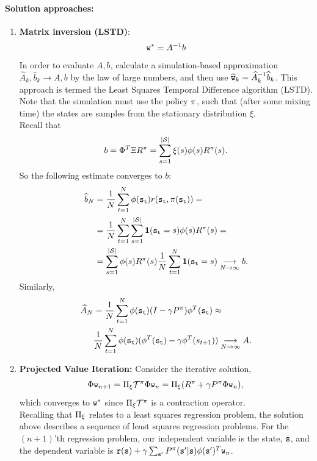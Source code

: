 \paragraph{Solution approaches:}
\begin{enumerate}
\item \textbf{Matrix inversion (LSTD)}: $${\tt w}^* = A^{-1}b$$
In order to evaluate $A,b$, calculate a simulation-based approximation $\widehat{A}_k,\hat{b}_k \rightarrow A,b$ by the law of large numbers, and then use $\widehat{{\tt w}}_k = \widehat{A}_k^{-1} \widehat{b}_k$. This approach is termed the Least Squares Temporal Difference algorithm (LSTD). Note that the simulation must use the policy $\pi$, such that (after some mixing time) the states are samples from the stationary distribution $\xi$.\\
Recall that
$$b = \Phi^T \Xi R^\pi = \sum_{s=1}^{|\mathcal{S}|} \xi(s)  {\phi}(s) R^\pi(s).$$
So the following estimate converges to $b$:
\begin{align*}
\widehat{b}_N &= \frac{1}{N} \sum_{t=1}^N  {\phi}({\tt s}_{\tt t}) r({\tt s}_{\tt t},\pi({\tt s}_{\tt t})) = \\
&= \frac{1}{N}\sum_{t=1}^N\sum_{s=1}^{|\mathcal{S}|} {\bf1}({\tt s}_{\tt t}=s) {\phi}(s) R^\pi(s) =\\
&= \sum_{s=1}^{|\mathcal{S}|} {\phi}(s) R^\pi(s) \frac{1}{N}\sum_{t=1}^N {\bf1}({\tt s}_{\tt t}=s) \underset{N\rightarrow \infty}{\longrightarrow} b .
\end{align*}
Similarly,
\begin{align*}
\widehat{A}_N &= \frac{1}{N} \sum_{t=1}^N  {\phi}({\tt s}_{\tt t})(I-\gamma P^\pi) {\phi}^T({\tt s}_{\tt t}) \approx \\
&\frac{1}{N} \sum_{t=1}^N {\phi}({\tt s}_{\tt t})( {\phi}^T({\tt s}_{\tt t})-\gamma {\phi}^T(s_{t+1}))  \underset{N\rightarrow \infty}{\longrightarrow} A .
\end{align*}

\item \textbf{Projected Value Iteration:}
Consider the iterative solution,
$$\Phi {\tt w}_{n+1} = \Pi_\xi \mathcal{T}^\pi \Phi {\tt w}_n = \Pi_\xi(R^\pi+\gamma P^\pi \Phi {\tt w}_n),$$
which converges to ${\tt w}^*$ since $\Pi_\xi \mathcal{T}^\pi$ is a contraction operator.\\

Recalling that $\Pi_\xi$ relates to a least squares regression problem, the solution above describes a sequence of least squares regression problems. For the $(n+1)$'th regression problem, our independent variable is the state, ${\tt s}$, and the dependent variable is ${\tt r}({\tt s}) +\gamma \sum_{{\tt s}'}P^\pi({\tt s}'|{\tt s}) \phi({\tt s}')^T {\tt w}_n$.


\end{enumerate}
